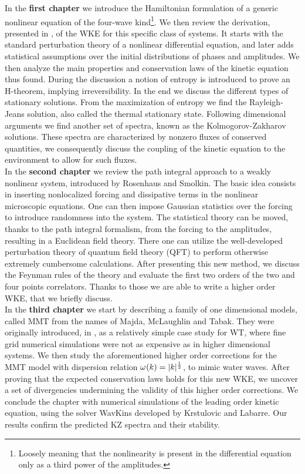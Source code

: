     In the \textbf{first chapter} we introduce the Hamiltonian formulation of a generic nonlinear equation of the four-wave kind\footnote{Loosely meaning that the nonlinearity is present in the differential equation only as a third power of the amplitudes.}. We then review the derivation, presented in \cite{Onorato2020}, of the WKE for this specific class of systems. It starts with the standard perturbation theory of a nonlinear differential equation, and later adds statistical assumptions over the initial distributions of phases and amplitudes. We then analyze the main properties and conservation laws of the kinetic equation thus found. During the discussion a notion of entropy is introduced to prove an H-theorem, implying irreversibility. In the end we discuss the different types of stationary solutions. From the maximization of entropy we find the Rayleigh-Jeans solution, also called the thermal stationary state. Following dimensional arguments we find another set of spectra, known as the Kolmogorov-Zakharov solutions. These spectra are characterized by nonzero fluxes of conserved quantities, we consequently discuss the coupling of the kinetic equation to the environment to allow for such fluxes.\\
    In the \textbf{second chapter} we review the path integral approach to a weakly nonlinear system, introduced by Rosenhaus and Smolkin. The basic idea consists in inserting nonlocalized forcing and dissipative terms in the nonlinear microscopic equations. One can then impose Gaussian statistics over the forcing to introduce randomness into the system. The statistical theory can be moved, thanks to the path integral formalism, from the forcing to the amplitudes, resulting in a Euclidean field theory. There one can utilize the well-developed perturbation theory of quantum field theory (QFT) to perform otherwise extremely cumbersome calculations. After presenting this new method, we discuss the Feynman rules of the theory and evaluate the first two orders of the two and four points correlators. Thanks to those we are able to write a higher order WKE, that we briefly discuss.\\
    In the \textbf{third chapter} we start by describing a family of one dimensional models, called MMT from the names of Majda, McLaughlin and Tabak. They were originally introduced, in \cite{Majda1997}, as a relatively simple case study for WT, where fine grid numerical simulations were not as expensive as in higher dimensional systems. We then study the aforementioned higher order corrections for the MMT model with dispersion relation $\omega^{} (k) = |k|^\frac{1}{2}$, to mimic water waves. After proving that the expected conservation laws holds for this new WKE, we uncover a set of divergencies undermining the validity of this higher order corrections. We conclude the chapter with numerical simulations of the leading order kinetic equation, using the solver WavKins developed by Krstulovic and Labarre. Our results confirm the predicted  KZ spectra and their stability. 



    

